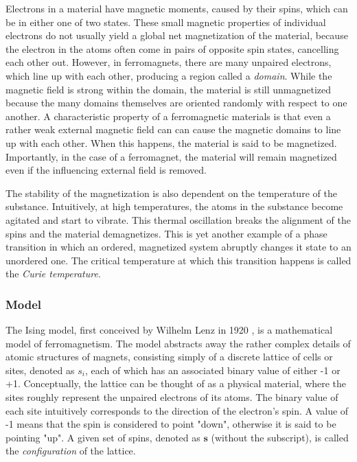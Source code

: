 \documentclass[12pt]{article}
\begin{document}
Electrons in a material have magnetic moments, caused by their spins, which can be in either one of two states. These small magnetic properties of individual electrons do not usually yield a global net magnetization of the material, because the electron in the atoms often come in pairs of opposite spin states, cancelling each other out. However, in ferromagnets, there are many unpaired electrons, which line up with each other, producing a region called a \textit{domain}. While the magnetic field is strong within the domain, the material is still unmagnetized because the many domains themselves are oriented randomly with respect to one another. A characteristic property of a ferromagnetic materials is that even a rather weak external magnetic field can can cause the magnetic domains to line up with each other. When this happens, the material is said to be magnetized. Importantly, in the case of a ferromagnet, the material will remain magnetized even if the influencing external field is removed. 

The stability of the magnetization is also dependent on the temperature of the substance. Intuitively, at high temperatures, the atoms in the substance become agitated and start to vibrate. This thermal oscillation breaks the alignment of the spins and the material demagnetizes. This is yet another example of a phase transition in which an ordered, magnetized system abruptly changes it state to an unordered one. The critical temperature at which this transition happens is called the \textit{Curie temperature}.

\subsubsection{Model} 

The Ising model, first conceived by Wilhelm Lenz in 1920 \cite{ising-history}, is a mathematical model of ferromagnetism. The model abstracts away the rather complex details of atomic structures of magnets, consisting simply of a discrete lattice of cells or sites, denoted as $s_i$, each of which has an associated binary value of either -1 or +1. Conceptually, the lattice can be thought of as a physical material, where the sites roughly represent the unpaired electrons of its atoms. The binary value of each site intuitively corresponds to the direction of the electron's spin. A value of -1 means that the spin is considered to point "down", otherwise it is said to be pointing "up". A given set of spins, denoted as $\boldsymbol{s}$ (without the subscript), is called the \textit{configuration} of the lattice. \cite{statistical-mechanics}
\end{document}
